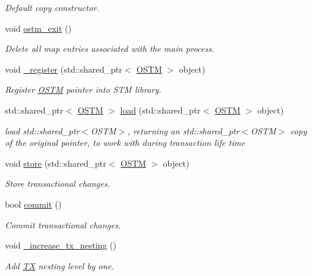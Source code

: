 \begin{DoxyCompactItemize}
\begin{DoxyCompactList}\small\item\em Default copy constructor. \end{DoxyCompactList}\item 
void \hyperlink{class_t_x_aa9739c5c2077454c779098db7baefc2b}{ostm\+\_\+exit} ()
\begin{DoxyCompactList}\small\item\em Delete all map entries associated with the main process. \end{DoxyCompactList}\item 
void \hyperlink{class_t_x_abc32af2f51df97ac483e5bfe7db6ca6e}{\+\_\+register} (std\+::shared\+\_\+ptr$<$ \hyperlink{class_o_s_t_m}{O\+S\+TM} $>$ object)
\begin{DoxyCompactList}\small\item\em Register \hyperlink{class_o_s_t_m}{O\+S\+TM} pointer into S\+TM library. \end{DoxyCompactList}\item 
std\+::shared\+\_\+ptr$<$ \hyperlink{class_o_s_t_m}{O\+S\+TM} $>$ \hyperlink{class_t_x_a1d78262b8831ddd042ed491f2e600e24}{load} (std\+::shared\+\_\+ptr$<$ \hyperlink{class_o_s_t_m}{O\+S\+TM} $>$ object)
\begin{DoxyCompactList}\small\item\em load std\+::shared\+\_\+ptr$<$\+O\+S\+T\+M$>$, returning an std\+::shared\+\_\+ptr$<$\+O\+S\+T\+M$>$ copy of the original pointer, to work with during transaction life time \end{DoxyCompactList}\item 
void \hyperlink{class_t_x_a7dbcb369aa4a3370b6c6829d278ece5d}{store} (std\+::shared\+\_\+ptr$<$ \hyperlink{class_o_s_t_m}{O\+S\+TM} $>$ object)
\begin{DoxyCompactList}\small\item\em Store transactional changes. \end{DoxyCompactList}\item 
bool \hyperlink{class_t_x_a9dde5d356b35e557448e58d260087356}{commit} ()
\begin{DoxyCompactList}\small\item\em Commit transactional changes. \end{DoxyCompactList}\item 
void \hyperlink{class_t_x_a1384bdf12d795854b5d32e7f61ffbdb8}{\+\_\+increase\+\_\+tx\+\_\+nesting} ()
\begin{DoxyCompactList}\small\item\em Add \hyperlink{class_t_x}{TX} nesting level by one. \end{DoxyCompactList}\item 

\end{DoxyCompactItemize}
